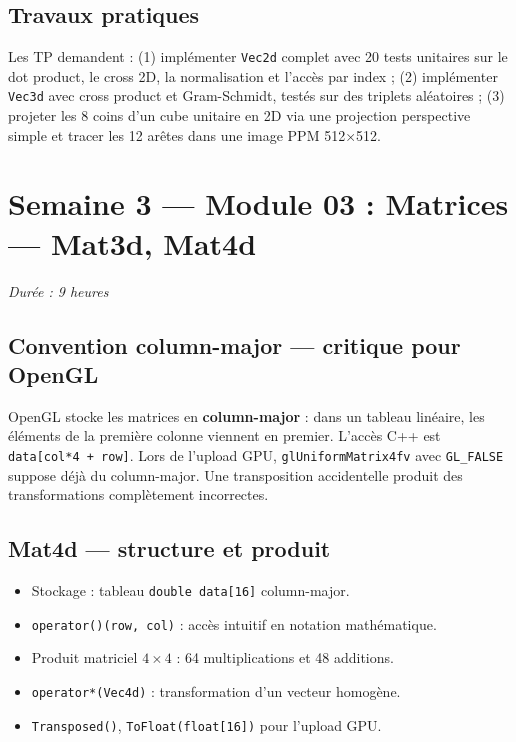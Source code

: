 \documentclass[11pt,a4paper]{article}
\begin{document}
\subsection{Travaux pratiques}
Les TP demandent : (1) implémenter \texttt{Vec2d} complet avec 20 tests unitaires sur le dot
product, le cross 2D, la normalisation et l'accès par index ; (2) implémenter \texttt{Vec3d} avec
cross product et Gram-Schmidt, testés sur des triplets aléatoires ; (3) projeter les 8 coins d'un
cube unitaire en 2D via une projection perspective simple et tracer les 12 arêtes dans une image
PPM 512×512.

\section{Semaine 3 — Module 03 : Matrices — Mat3d, Mat4d}
\textit{Durée : 9 heures}

\subsection{Convention column-major — critique pour OpenGL}
OpenGL stocke les matrices en \textbf{column-major} : dans un tableau linéaire, les éléments de la
première colonne viennent en premier. L'accès C++ est \texttt{data[col*4 + row]}. Lors de
l'upload GPU, \texttt{glUniformMatrix4fv} avec \texttt{GL\_FALSE} suppose déjà du column-major.
Une transposition accidentelle produit des transformations complètement incorrectes.

\subsection{Mat4d — structure et produit}
\begin{itemize}[noitemsep]
  \item Stockage : tableau \texttt{double data[16]} column-major.
  \item \texttt{operator()(row, col)} : accès intuitif en notation mathématique.
  \item Produit matriciel $4\times4$ : 64 multiplications et 48 additions.
  \item \texttt{operator*(Vec4d)} : transformation d'un vecteur homogène.
  \item \texttt{Transposed()}, \texttt{ToFloat(float[16])} pour l'upload GPU.
\end{itemize}
\end{document}
